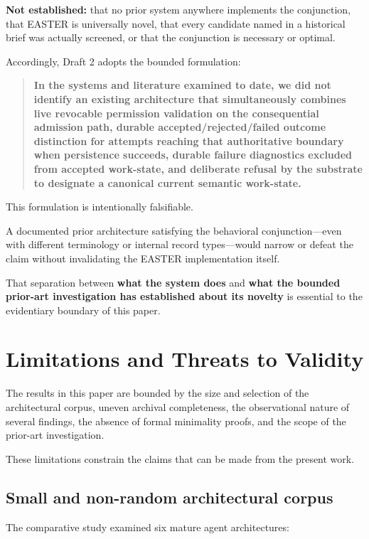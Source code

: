 \documentclass[11pt]{article}
\begin{document}
\textbf{Not established:} that no prior system anywhere implements the conjunction, that EASTER is universally novel, that every candidate named in a historical brief was actually screened, or that the conjunction is necessary or optimal.

Accordingly, Draft 2 adopts the bounded formulation:

\begin{quote}
\textbf{In the systems and literature examined to date, we did not identify an existing architecture that simultaneously combines live revocable permission validation on the consequential admission path, durable accepted/rejected/failed outcome distinction for attempts reaching that authoritative boundary when persistence succeeds, durable failure diagnostics excluded from accepted work-state, and deliberate refusal by the substrate to designate a canonical current semantic work-state.}
\end{quote}

This formulation is intentionally falsifiable.

A documented prior architecture satisfying the behavioral conjunction---even with different terminology or internal record types---would narrow or defeat the claim without invalidating the EASTER implementation itself.

That separation between \textbf{what the system does} and \textbf{what the bounded prior-art investigation has established about its novelty} is essential to the evidentiary boundary of this paper.
\section{Limitations and Threats to Validity}

The results in this paper are bounded by the size and selection of the architectural corpus, uneven archival completeness, the observational nature of several findings, the absence of formal minimality proofs, and the scope of the prior-art investigation.

These limitations constrain the claims that can be made from the present work.

\subsection{Small and non-random architectural corpus}

The comparative study examined six mature agent architectures:
\end{document}
